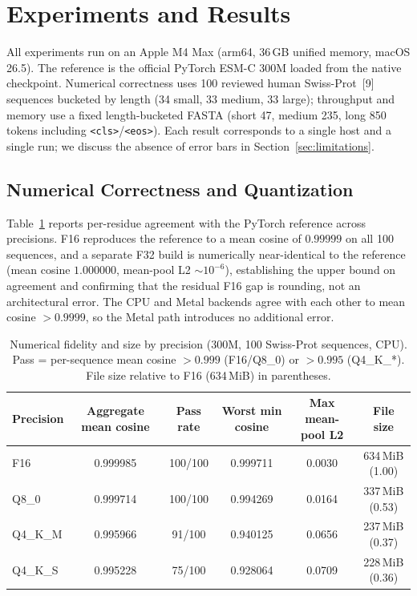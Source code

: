 \documentclass{article}
\begin{document}
\section{Experiments and Results}
\label{sec:results}

All experiments run on an Apple M4 Max (arm64, 36\,GB unified memory, macOS 26.5). The reference is the official PyTorch ESM-C 300M loaded from the native checkpoint. Numerical correctness uses 100 reviewed human Swiss-Prot~[9] sequences bucketed by length (34 small, 33 medium, 33 large); throughput and memory use a fixed length-bucketed FASTA (short 47, medium 235, long 850 tokens including \texttt{<cls>}/\texttt{<eos>}). Each result corresponds to a single host and a single run; we discuss the absence of error bars in Section~\ref{sec:limitations}.

\subsection{Numerical Correctness and Quantization}

Table~\ref{tab:correctness} reports per-residue agreement with the PyTorch reference across precisions. F16 reproduces the reference to a mean cosine of $0.99999$ on all 100 sequences, and a separate F32 build is numerically near-identical to the reference (mean cosine $1.000000$, mean-pool L2 $\sim10^{-6}$), establishing the upper bound on agreement and confirming that the residual F16 gap is rounding, not an architectural error. The CPU and Metal backends agree with each other to mean cosine $>0.9999$, so the Metal path introduces no additional error.

\begin{table}
  \caption{Numerical fidelity and size by precision (300M, 100 Swiss-Prot sequences, CPU). Pass = per-sequence mean cosine $>0.999$ (F16/Q8\_0) or $>0.995$ (Q4\_K\_*). File size relative to F16 (634\,MiB) in parentheses.}
  \label{tab:correctness}
  \centering
  \begin{tabular}{lccccc}
    \toprule
    Precision & Aggregate mean cosine & Pass rate & Worst min cosine & Max mean-pool L2 & File size \\
    \midrule
    F16    & 0.999985 & 100/100 & 0.999711 & 0.0030 & 634\,MiB (1.00) \\
    Q8\_0   & 0.999714 & 100/100 & 0.994269 & 0.0164 & 337\,MiB (0.53) \\
    Q4\_K\_M & 0.995966 & 91/100  & 0.940125 & 0.0656 & 237\,MiB (0.37) \\
    Q4\_K\_S & 0.995228 & 75/100  & 0.928064 & 0.0709 & 228\,MiB (0.36) \\
    \bottomrule
  \end{tabular}
\end{table}
\end{document}
